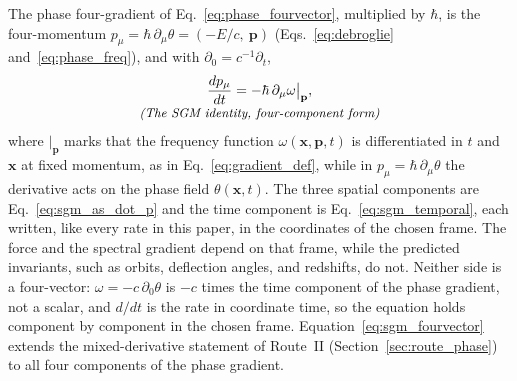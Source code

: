 \documentclass[aps,prd,onecolumn,tightenlines,nofootinbib,notitlepage,11pt,floatfix]{revtex4-2}
\theoremstyle{indentedtheorem}
\begin{document}
The phase four-gradient of Eq.~\eqref{eq:phase_fourvector}, multiplied by $\hbar$, is the four-momentum $p_\mu=\hbar\,\partial_\mu\theta=(-E/c,\ \mathbf{p})$ (Eqs.~\eqref{eq:debroglie} and~\eqref{eq:phase_freq}), and with $\partial_0=c^{-1}\partial_t$,
\begin{equation}
    \begin{gathered}
    \frac{dp_\mu}{dt} = -\hbar\,\partial_\mu\omega\big|_{\mathbf{p}} , \\[-3pt]
    \text{\small\itshape (The SGM identity, four-component form)}
    \end{gathered}
    \label{eq:sgm_fourvector}
\end{equation}
where $|_{\mathbf{p}}$ marks that the frequency function $\omega(\mathbf{x},\mathbf{p},t)$ is differentiated in $t$ and $\mathbf{x}$ at fixed momentum, as in Eq.~\eqref{eq:gradient_def}, while in $p_\mu=\hbar\,\partial_\mu\theta$ the derivative acts on the phase field $\theta(\mathbf{x},t)$. The three spatial components are Eq.~\eqref{eq:sgm_as_dot_p} and the time component is Eq.~\eqref{eq:sgm_temporal}, each written, like every rate in this paper, in the coordinates of the chosen frame. The force and the spectral gradient depend on that frame, while the predicted invariants, such as orbits, deflection angles, and redshifts, do not. Neither side is a four-vector: $\omega=-c\,\partial_0\theta$ is $-c$ times the time component of the phase gradient, not a scalar, and $d/dt$ is the rate in coordinate time, so the equation holds component by component in the chosen frame. Equation~\eqref{eq:sgm_fourvector} extends the mixed-derivative statement of Route~II (Section~\ref{sec:route_phase}) to all four components of the phase gradient.
\end{document}
